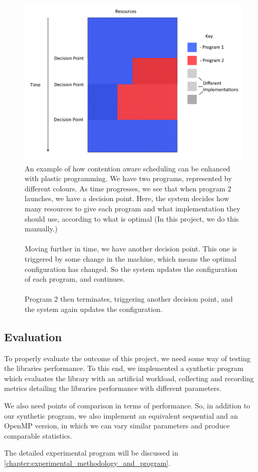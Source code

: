 \begin{figure}
	\centering
	\includegraphics[width=\textwidth]{graphics/plastic_contention_aware_scheduling.png}
	\caption{An example of how contention aware scheduling can be enhanced with plastic programming. We have two programs, represented by different colours. As time progresses, we see that when program 2 launches, we have a decision point. Here, the system decides how many resources to give each program and what implementation they should use, according to what is optimal (In this project, we do this manually.) \\ \\ Moving further in time, we have another decision point. This one is triggered by some change in the machine, which means the optimal configuration has changed. So the system updates the configuration of each program, and continues. \\ \\ Program 2 then terminates, triggering another decision point, and the system again updates the configuration.}
	\label{fig:plastic_contention_aware_scheduling}
\end{figure}



\subsection{Evaluation}

To properly evaluate the outcome of this project, we need some way of testing the libraries performance. To this end, we implemented a synthetic program which evaluates the library with an artificial workload, collecting and recording metrics detailing the libraries performance with different parameters.  

We also need points of comparison in terms of performance. So, in addition to our synthetic program, we also implement an equivalent sequential and an OpenMP version, in which we can vary similar parameters and produce comparable statistics. 

The detailed experimental program will be discussed in \ref{chapter:experimental_methodology_and_program}.